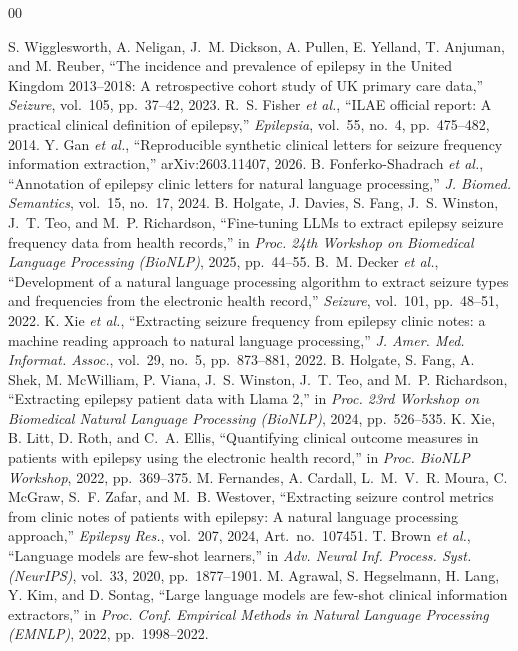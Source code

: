 \documentclass[conference]{IEEEtran}
\begin{document}
\begin{thebibliography}{00}

 S. Wigglesworth, A. Neligan, J.~M. Dickson, A. Pullen, E. Yelland, T. Anjuman, and M. Reuber, ``The incidence and prevalence of epilepsy in the United Kingdom 2013--2018: A retrospective cohort study of UK primary care data,'' \emph{Seizure}, vol.~105, pp.~37--42, 2023.
 R.~S. Fisher \emph{et al.}, ``ILAE official report: A practical clinical definition of epilepsy,'' \emph{Epilepsia}, vol.~55, no.~4, pp.~475--482, 2014.
 Y. Gan \emph{et al.}, ``Reproducible synthetic clinical letters for seizure frequency information extraction,'' arXiv:2603.11407, 2026.
 B. Fonferko-Shadrach \emph{et al.}, ``Annotation of epilepsy clinic letters for natural language processing,'' \emph{J. Biomed. Semantics}, vol.~15, no.~17, 2024.
 B. Holgate, J. Davies, S. Fang, J.~S. Winston, J.~T. Teo, and M.~P. Richardson, ``Fine-tuning LLMs to extract epilepsy seizure frequency data from health records,'' in \emph{Proc. 24th Workshop on Biomedical Language Processing (BioNLP)}, 2025, pp.~44--55.
 B.~M. Decker \emph{et al.}, ``Development of a natural language processing algorithm to extract seizure types and frequencies from the electronic health record,'' \emph{Seizure}, vol.~101, pp.~48--51, 2022.
 K. Xie \emph{et al.}, ``Extracting seizure frequency from epilepsy clinic notes: a machine reading approach to natural language processing,'' \emph{J. Amer. Med. Informat. Assoc.}, vol.~29, no.~5, pp.~873--881, 2022.
 B. Holgate, S. Fang, A. Shek, M. McWilliam, P. Viana, J.~S. Winston, J.~T. Teo, and M.~P. Richardson, ``Extracting epilepsy patient data with Llama 2,'' in \emph{Proc. 23rd Workshop on Biomedical Natural Language Processing (BioNLP)}, 2024, pp.~526--535.
 K. Xie, B. Litt, D. Roth, and C.~A. Ellis, ``Quantifying clinical outcome measures in patients with epilepsy using the electronic health record,'' in \emph{Proc. BioNLP Workshop}, 2022, pp.~369--375.
 M. Fernandes, A. Cardall, L.~M.~V.~R. Moura, C. McGraw, S.~F. Zafar, and M.~B. Westover, ``Extracting seizure control metrics from clinic notes of patients with epilepsy: A natural language processing approach,'' \emph{Epilepsy Res.}, vol.~207, 2024, Art.~no.~107451.
 T. Brown \emph{et al.}, ``Language models are few-shot learners,'' in \emph{Adv. Neural Inf. Process. Syst. (NeurIPS)}, vol.~33, 2020, pp.~1877--1901.
 M. Agrawal, S. Hegselmann, H. Lang, Y. Kim, and D. Sontag, ``Large language models are few-shot clinical information extractors,'' in \emph{Proc. Conf. Empirical Methods in Natural Language Processing (EMNLP)}, 2022, pp.~1998--2022.

\end{thebibliography}
\end{document}
